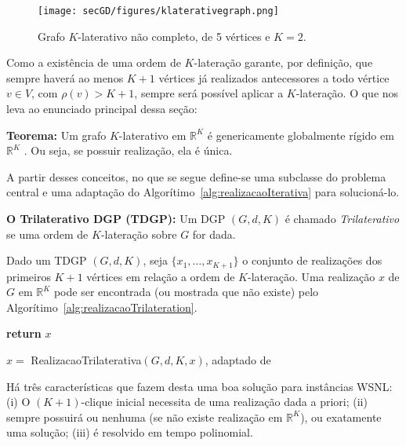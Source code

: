 \begin{figure}[H]
	\begin{center}
		\texttt{[image: secGD/figures/klaterativegraph.png]}
	\end{center}
	\caption{Grafo $K$-laterativo não completo, de 5 vértices e $K = 2$.}
	\label{fig:klaterativegraph}
\end{figure}

Como a existência de uma ordem de $K$-lateração garante, por definição, que sempre haverá ao menos $K+1$ vértices já realizados antecessores a todo vértice $v \in V$, com $\rho(v) > K+1$, sempre será possível aplicar a $K$-lateração. O que nos leva ao enunciado principal dessa seção:

\begin{center}
	\begin{minipage}{0.93 \linewidth}
		\textbf{Teorema:} Um grafo $K$-laterativo em $\mathbb{R}^K$ é genericamente globalmente rígido em $\mathbb{R}^K$ \cite{eren2004rigidity}. Ou seja, se possuir realização, ela é única.
	\end{minipage}
\end{center}

A partir desses conceitos, no que se segue define-se uma subclasse do problema central e uma adaptação do Algorítimo~\ref{alg:realizacaoIterativa} para solucioná-lo.
\begin{center}
	\begin{minipage}{0.93 \linewidth}
		\textbf{O Trilaterativo DGP (TDGP):} Um DGP $(G,d,K)$ é chamado \textit{Trilaterativo} se uma ordem de $K$-lateração sobre $G$ for dada.
	\end{minipage}
\end{center}

Dado um TDGP $(G,d,K)$, seja $\{x_1, \dots,x_{K+1}\}$ o conjunto de realizações dos primeiros $K+1$ vértices em relação a ordem de $K$-lateração. Uma realização $x$ de $G$ em $\mathbb{R}^K$ pode ser encontrada (ou mostrada que não existe) pelo Algorítimo~\ref{alg:realizacaoTrilateration}.
\\

\begin{algorithm}[H]
	\label{alg:realizacaoTrilateration}
	\textbf{return} $x$\;
	\caption{$x =$ RealizacaoTrilaterativa$(G,d, K, x)$, adaptado de \cite{libertiEDG}}
\end{algorithm}
\vspace{0.4cm}

Há três características que fazem desta uma boa solução para instâncias WSNL: (i) O $(K+1)$-clique inicial necessita de uma realização dada a priori; (ii) sempre possuirá ou nenhuma (se não existe realização em $\mathbb{R}^K$), ou exatamente uma solução; (iii) é resolvido em tempo polinomial.

